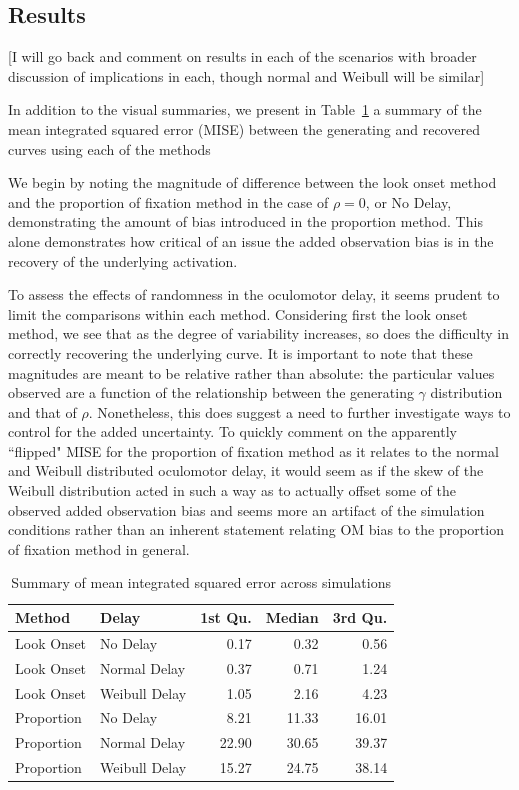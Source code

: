 \documentclass{article}
\begin{document}
\subsection{Results}

[I will go back and comment on results in each of the scenarios with broader discussion of implications in each, though normal and Weibull will be similar]

In addition to the visual summaries, we present in Table~\ref{tab:mise_sims} a summary of the mean integrated squared error (MISE) between the generating and recovered curves using each of the methods

We begin by noting the  magnitude of difference between the look onset method and the proportion of fixation method in the case of $\rho = 0$, or No Delay, demonstrating the amount of bias introduced in the proportion method. This alone demonstrates how critical of an issue the added observation bias is in the recovery of the underlying activation.

To assess the effects of randomness in the oculomotor delay, it seems prudent to limit the comparisons within each method. Considering first the look onset method, we see that as the degree of variability increases, so does the difficulty in correctly recovering the underlying curve. It is important to note that these magnitudes are meant to be relative rather than absolute: the particular values observed are a function of the relationship between the generating $\gamma$ distribution and that of $\rho$. Nonetheless, this does suggest a need to further investigate ways to control for the added uncertainty. To quickly comment on the apparently ``flipped" MISE for the proportion of fixation method as it relates to the normal and Weibull distributed oculomotor delay, it would seem as if the skew of the Weibull distribution acted in such a way as to actually offset some of the observed added observation bias and seems more an artifact of the simulation conditions rather than an inherent statement relating OM bias to the proportion of fixation method in general.

\begin{table}[H]
\centering
\begin{tabular}{llrrr}
  \hline
Method & Delay & 1st Qu. & Median & 3rd Qu. \\ 
  \hline
Look Onset & No Delay & 0.17 & 0.32 & 0.56 \\ 
  Look Onset & Normal Delay & 0.37 & 0.71 & 1.24 \\ 
  Look Onset & Weibull Delay & 1.05 & 2.16 & 4.23 \\ 
  Proportion & No Delay & 8.21 & 11.33 & 16.01 \\ 
  Proportion & Normal Delay & 22.90 & 30.65 & 39.37 \\ 
  Proportion & Weibull Delay & 15.27 & 24.75 & 38.14 \\ 
   \hline
\end{tabular}
\caption{Summary of mean integrated squared error across simulations}
\label{tab:mise_sims}
\end{table}
\end{document}

